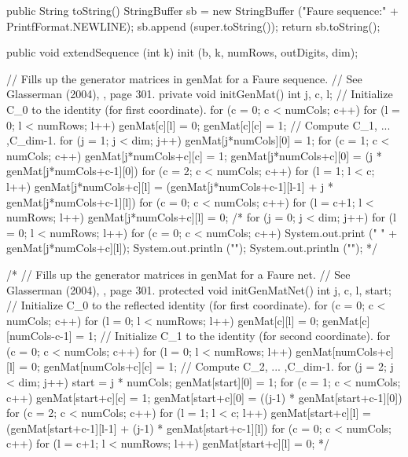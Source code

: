 \begin{code}\begin{hide}

   public String toString() {
      StringBuffer sb = new StringBuffer ("Faure sequence:" +
                  PrintfFormat.NEWLINE);
      sb.append (super.toString());
      return sb.toString();
   }


   public void extendSequence (int k) {
      init (b, k, numRows, outDigits, dim);
   }


   // Fills up the generator matrices in genMat for a Faure sequence.
   // See Glasserman (2004), \cite{fGLA04a}, page 301.
   private void initGenMat() {
      int j, c, l;
      // Initialize C_0 to the identity (for first coordinate).
      for (c = 0; c < numCols; c++) {
         for (l = 0; l < numRows; l++)
            genMat[c][l] = 0;
         genMat[c][c] = 1;
      }
      // Compute C_1, ... ,C_{dim-1}.
      for (j = 1; j < dim; j++) {
         genMat[j*numCols][0] = 1;
         for (c = 1; c < numCols; c++) {
            genMat[j*numCols+c][c] = 1;
            genMat[j*numCols+c][0] = (j * genMat[j*numCols+c-1][0]) %
         }
         for (c = 2; c < numCols; c++) {
            for (l = 1; l < c; l++)
               genMat[j*numCols+c][l] = (genMat[j*numCols+c-1][l-1]
                                        + j * genMat[j*numCols+c-1][l]) %
         }
         for (c = 0; c < numCols; c++)
            for (l = c+1; l < numRows; l++)
               genMat[j*numCols+c][l] = 0;
      }
/*
      for (j = 0; j < dim; j++) {
     for (l = 0; l < numRows; l++) {
         for (c = 0; c < numCols; c++)
            System.out.print ("  " + genMat[j*numCols+c][l]);
       System.out.println ("");
      }
        System.out.println ("");
  }
*/
   }

/*
   // Fills up the generator matrices in genMat for a Faure net.
   // See Glasserman (2004), \cite{fGLA04a}, page 301.
   protected void initGenMatNet() {
      int j, c, l, start;
      // Initialize C_0 to the reflected identity (for first coordinate).
      for (c = 0; c < numCols; c++) {
         for (l = 0; l < numRows; l++)
            genMat[c][l] = 0;
         genMat[c][numCols-c-1] = 1;
      }
      // Initialize C_1 to the identity (for second coordinate).
      for (c = 0; c < numCols; c++) {
         for (l = 0; l < numRows; l++)
            genMat[numCols+c][l] = 0;
         genMat[numCols+c][c] = 1;
      }
      // Compute C_2, ... ,C_{dim-1}.
      for (j = 2; j < dim; j++) {
         start = j * numCols;
         genMat[start][0] = 1;
         for (c = 1; c < numCols; c++) {
            genMat[start+c][c] = 1;
            genMat[start+c][0] = ((j-1) * genMat[start+c-1][0]) %
         }
         for (c = 2; c < numCols; c++) {
            for (l = 1; l < c; l++)
               genMat[start+c][l] = (genMat[start+c-1][l-1]
                                     + (j-1) * genMat[start+c-1][l]) %
         }
         for (c = 0; c < numCols; c++)
            for (l = c+1; l < numRows; l++)
               genMat[start+c][l] = 0;
      }
   }
*/


\end{hide}
\end{code}
